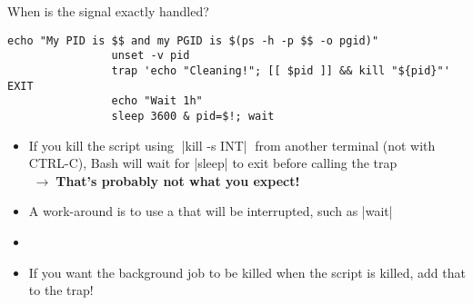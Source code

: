 \begin{frame}[fragile]{When is the signal exactly handled?}
\begin{overlayarea}{\textwidth}{0.28\textheight}
\begin{onlyenv}
\begin{lstlisting}[style=MyBash, firstnumber=12]
                echo "My PID is $$ and my PGID is $(ps -h -p $$ -o pgid)"
                unset -v pid
                trap 'echo "Cleaning!"; [[ $pid ]] && kill "${pid}"' EXIT
                echo "Wait 1h"
                sleep 3600 & pid=$!; wait
            \end{lstlisting}
        \end{onlyenv}
    \end{overlayarea}
    \vspace{-1.5mm}
    \begin{itemize}
        \item If you kill the script using $\;$\bash|kill -s INT|$\;$ from another terminal (not with CTRL-C), Bash will wait for \bash|sleep| to exit before calling the trap\\
              $\;\to\;$\alert{\textbf{That's probably not what you expect!}}
        \item<2-> A work-around is to use a  that will be interrupted, such as \bash|wait|
        \item<2-> 
        \item<3-> If you want the background job to be killed when the script is killed, add that to the trap!
    \end{itemize}
\end{frame}
